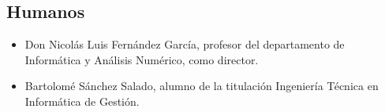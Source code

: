 \subsection{Humanos}

\begin{itemize}
   \item Don Nicolás Luis Fernández García, profesor del departamento de
   Informática y Análisis Numérico, como director.
   \item Bartolomé Sánchez Salado, alumno de la titulación Ingeniería Técnica en
   Informática de Gestión.
\end{itemize}

